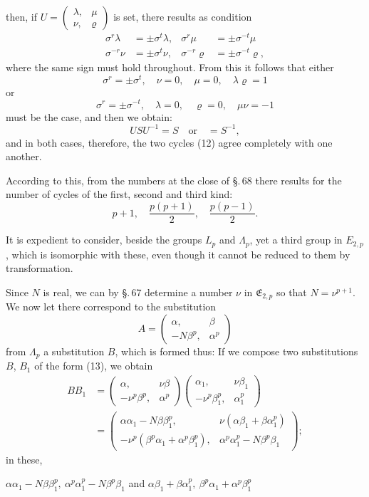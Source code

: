 then, if $U = \begin{pmatrix}\lambda, & \mu\\ \nu, & \varrho\end{pmatrix}$ is set, there results as condition
\[
\begin{aligned}
\sigma^r\lambda &= \pm\sigma^t\lambda, & \sigma^r\mu &= \pm\sigma^{-t}\mu\\
\sigma^{-r}\nu &= \pm\sigma^t\nu, & \sigma^{-r}\varrho &= \pm\sigma^{-t}\varrho,
\end{aligned}
\]
where the same sign must hold throughout. From this it follows that either
\[
\sigma^r = \pm\sigma^t, \quad \nu = 0, \quad \mu = 0, \quad \lambda\varrho = 1
\]
or
\[
\sigma^r = \pm\sigma^{-t}, \quad \lambda = 0, \quad \varrho = 0, \quad \mu\nu = -1
\]
must be the case, and then we obtain:
\[
USU^{-1} = S \quad \text{or} \quad = S^{-1},
\]
and in both cases, therefore, the two cycles (12) agree completely with one another.

According to this, from the numbers at the close of \S.\,68 there results for the number of cycles of the first, second and third kind:
\[
p+1, \quad \frac{p(p+1)}{2}, \quad \frac{p(p-1)}{2}.
\]

It is expedient to consider, beside the groups $L_p$ and $\Lambda_p$, yet a third group in $E_{2,p}$, which is isomorphic with these, even though it cannot be reduced to them by transformation.

Since $N$ is real, we can by \S.\,67 determine a number $\nu$ in $\mathfrak{E}_{2,p}$ so that $N = \nu^{p+1}$. We now let there correspond to the substitution
\[
A = \begin{pmatrix}\alpha, & \beta\\ -N\beta^p, & \alpha^p\end{pmatrix}
\]
from $\Lambda_p$ a substitution $B$, which is formed thus:
If we compose two substitutions $B$, $B_1$ of the form (13), we obtain
\[
\begin{aligned}
BB_1 &= \begin{pmatrix}\alpha, & \nu\beta\\ -\nu^p\beta^p, & \alpha^p\end{pmatrix}\begin{pmatrix}\alpha_1, & \nu\beta_1\\ -\nu^p\beta_1^p, & \alpha_1^p\end{pmatrix}\\
&= \begin{pmatrix}\alpha\alpha_1 - N\beta\beta_1^p, & \nu(\alpha\beta_1+\beta\alpha_1^p)\\ -\nu^p(\beta^p\alpha_1+\alpha^p\beta_1^p), & \alpha^p\alpha_1^p - N\beta^p\beta_1\end{pmatrix};
\end{aligned}
\]
in these,

$\alpha\alpha_1 - N\beta\beta_1^p, \ \alpha^p\alpha_1^p - N\beta^p\beta_1$ and $\alpha\beta_1+\beta\alpha_1^p, \ \beta^p\alpha_1+\alpha^p\beta_1^p$
